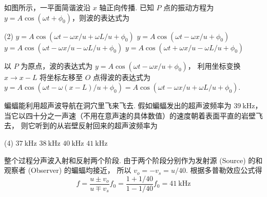 \begin{textfig}
  \begin{problem}
    如图所示，一平面简谐波沿 $x$ 轴正向传播. 已知 $P$ 点的振动方程为
    $y = A\cos(\omega t + \phi_0)$，则波的表达式为
    \begin{tasks}(2)
      \task[\true] $y = A\cos(\omega t - \omega x/u + \omega L/u + \phi_0)$
      \task $y = A\cos(\omega t - \omega x/u + \phi_0)$
      \task $y = A\cos(\omega t - \omega x/u - \omega L/u + \phi_0)$
      \task $y = A\cos(\omega t + \omega x/u - \omega L/u + \phi_0)$
    \end{tasks}
  \end{problem}
  \textfigsplit\centering
\end{textfig}
\scratch[4ex]
\begin{solution}
  以 $P$ 为原点，波的表达式为 $y = A\cos(\omega t - \omega x/u + \phi_0)$，
  利用坐标变换 $x \to x - L$ 将坐标左移至 $O$ 点得波的表达式为
  $ y = A\cos(\omega t - \omega (x - L)/u + \phi_0)
      = A\cos(\omega t - \omega x/u + \omega L/u + \phi_0)
  $.
\end{solution}

\begin{problem}
  蝙蝠能利用超声波导航在洞穴里飞来飞去. 假如蝙蝠发出的超声波频率为 $\qty{39}\kHz$，
  当它以四十分之一声速（不用在意声速的具体数值）的速度朝着表面平直的岩壁飞去，
  则它听到的从岩壁反射回来的超声波频率为
  \begin{tasks}(4)
    \task $\qty{37}\kHz$
    \task $\qty{38}\kHz$
    \task $\qty{40}\kHz$
    \task[\true] $\qty{41}\kHz$
  \end{tasks}
\end{problem}
\scratch[8ex]
\begin{solution}
  整个过程分声波入射和反射两个阶段.
  由于两个阶段分别作为发射源 (Source) 的和观察者 (Observer) 的蝙蝠均接近，
  所以 $v_o = -v_s = u/40$. 根据多普勒效应公式得
  \[
    f = \frac{u \pm v_o}{u \mp v_s} f_0 = \frac{1 + 1/40}{1 - 1/40} f_0
      = \qty{41}\kHz
  \]
\end{solution}

